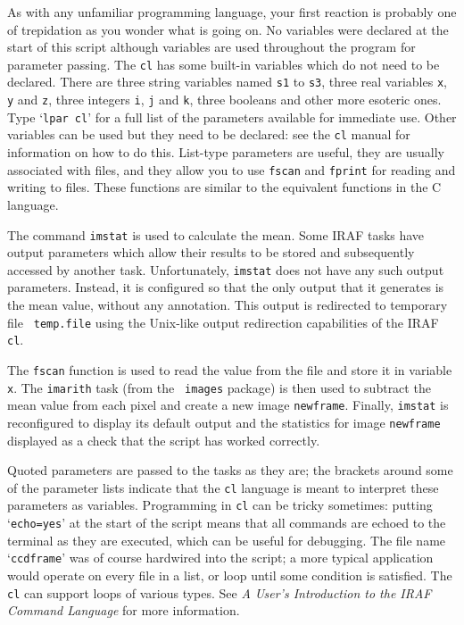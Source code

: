 \documentclass[twoside,11pt]{article}
\begin{document}
As with any unfamiliar programming language, your first reaction is 
probably one of trepidation as you wonder what is going on.  No variables
were declared at the start of this script although variables are used
throughout the program for parameter passing. The {\tt cl} has some built-in
variables which do not need to be declared. There are three string
variables named {\tt s1} to {\tt s3}, three real variables
{\tt x}, {\tt y} and {\tt z}, three
integers {\tt i}, {\tt j} and {\tt k},
three booleans and other more esoteric ones. Type
`{\tt lpar cl}' for a full list of the parameters available for
immediate use. Other variables can be used but they need to be
declared: see the {\tt cl} manual\cite{SHAMES86} for information on how to
do this. List-type parameters are useful, they are usually associated
with files, and they allow you to use {\tt fscan} and {\tt fprint}
for reading and
writing to files.  These functions are similar to the equivalent functions
in the C language.

The command {\tt imstat} is used to calculate the mean.  Some IRAF
tasks have output parameters which allow their results to be stored
and subsequently accessed by another task.  Unfortunately, {\tt imstat}
does not have any such output parameters.  Instead, it is configured
so that the only output that it generates is the mean value, without
any annotation.  This output is redirected to temporary file {\tt
temp.file} using the Unix-like output redirection capabilities of
the IRAF {\tt cl}.

The {\tt fscan} function is used to read the value from the file and
store it in variable {\tt x}.  The {\tt imarith} task (from the {\tt
images} package) is then used to subtract the mean value from each
pixel and create a new image {\tt newframe}.  Finally, {\tt imstat} is
reconfigured to display its default output and the statistics for image
{\tt newframe}  displayed as a check that the script has worked correctly.

Quoted parameters are passed to the tasks as they are; the brackets
around some of the parameter lists indicate that the {\tt cl} language is
meant to interpret these parameters as variables.  Programming in {\tt cl}
can be tricky sometimes: putting `{\tt echo=yes}' at the start of
the script means that all commands are echoed to the terminal as they
are executed, which can be useful for debugging.  The file name
`{\tt ccdframe}' was of course hardwired into the script; a more
typical application would operate on every file in a list, or loop
until some condition is satisfied. The {\tt cl} can support loops of
various types.  See {\it A User's Introduction to the IRAF Command
Language}\/\cite{SHAMES86} for more information.
\end{document}
